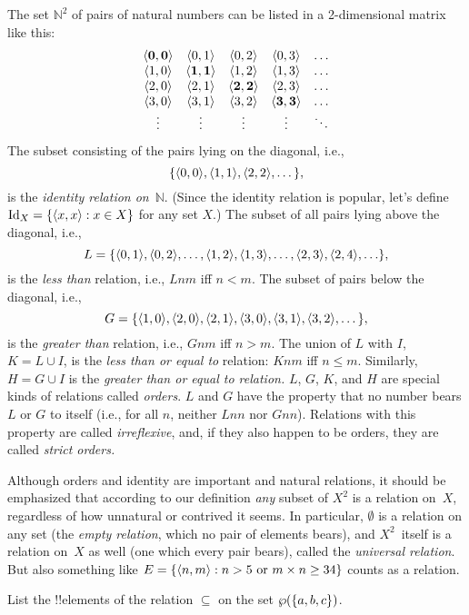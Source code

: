 \documentclass[../../../include/open-logic-section]{subfiles}
\begin{document}
\begin{ex}
The set $\mathbb{N}^{2}$ of
pairs of natural numbers can be listed in a 2-dimensional matrix like
this:
\[
\begin{array}{ccccc}
\mathbf{\tuple{ 0,0 }} & \tuple{ 0,1 } &
  \tuple{ 0,2 } & \tuple{ 0,3 } & \ldots\\
\tuple{ 1,0 } & \mathbf{\tuple{ 1,1 }} &
  \tuple{ 1,2 } & \tuple{ 1,3 } & \ldots\\
\tuple{ 2,0 } & \tuple{ 2,1 } &
  \mathbf{\tuple{ 2,2 }} & \tuple{ 2,3 } & \ldots\\
\tuple{ 3,0 } & \tuple{ 3,1 } & \tuple{ 3,2 } &
  \mathbf{\tuple{ 3,3 }} & \ldots\\
\vdots & \vdots & \vdots & \vdots & \mathbf{\ddots}
\end{array}
\]
The subset consisting of the pairs lying on the diagonal, i.e.,
\[
\{\langle 0,0  \rangle, \langle  1,1  \rangle, \langle  2,2  \rangle, \dots\},
\]
is the \emph{identity relation on}~$\mathbb{N}$. (Since the identity
relation is popular, let's define $\mathord{\mathrm{Id}_{X}}=\{ \langle  x,x  \rangle : x \in
  X \}$ for any set $X$.) The subset of all pairs lying above the
diagonal, i.e.,
\[
L = \{\langle  0,1  \rangle,\langle  0,2  \rangle,\ldots,\langle  1,2  \rangle,
\langle  1,3  \rangle, \dots, \langle  2,3  \rangle, \langle  2,4  \rangle,\ldots\},
\]
is the \emph{less than} relation, i.e., $Lnm$ iff $n<m$. The subset of
pairs below the diagonal, i.e.,
\[
G=\{ \langle  1,0  \rangle,\langle  2,0  \rangle,\langle 
  2,1  \rangle, \langle  3,0  \rangle,\langle  3,1  \rangle,\langle  3,2  \rangle, \dots\},
\]
is the \emph{greater than} relation, i.e., $Gnm$ iff $n>m$. The union
of $L$ with $I$, $K=L\cup I$, is the \emph{less than or equal to}
relation: $Knm$ iff $n \le m$. Similarly, $H=G \cup I$ is the
\emph{greater than or equal to relation.} $L$, $G$, $K$, and $H$ are
special kinds of relations called \emph{orders}. $L$ and $G$ have the
property that no number bears $L$ or $G$ to itself (i.e., for all $n$,
neither $Lnn$ nor $Gnn$). Relations with this property are called
\emph{irreflexive}, and, if they also happen to be orders, they are
called \emph{strict orders.}
\end{ex}

\begin{explain}
Although orders and identity are important and natural relations, it
should be emphasized that according to our definition \emph{any}
subset of $X^{2}$ is a relation on~$X$, regardless of how unnatural or
contrived it seems. In particular, $\emptyset$ is a relation on any
set (the \emph{empty relation}, which no pair of elements bears), and
$X^{2}$~itself is a relation on~$X$ as well (one which every pair
bears), called the \emph{universal relation}. But also something like
$E=\{ \langle n, m \rangle : n>5 \text{ or } m \times n \ge 34 \}$ counts as
a relation.
\end{explain}

\begin{prob}
List the !!{element}s of the relation $\subseteq$ on the set
$\wp(\{a, b, c\})$.
\end{prob}
\end{document}

